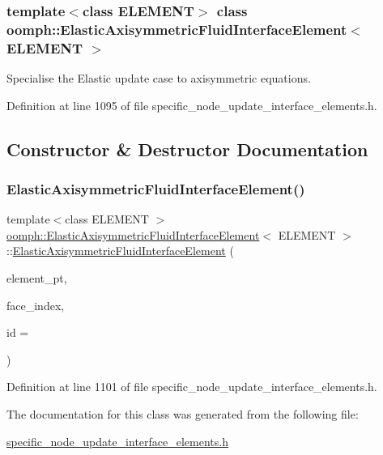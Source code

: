 \subsubsection*{template$<$class E\+L\+E\+M\+E\+NT$>$\newline
class oomph\+::\+Elastic\+Axisymmetric\+Fluid\+Interface\+Element$<$ E\+L\+E\+M\+E\+N\+T $>$}

Specialise the Elastic update case to axisymmetric equations. 

Definition at line 1095 of file specific\+\_\+node\+\_\+update\+\_\+interface\+\_\+elements.\+h.



\subsection{Constructor \& Destructor Documentation}
\mbox{\label{classoomph_1_1ElasticAxisymmetricFluidInterfaceElement_a9cb419f11aa4504bca4b6a9c40cca505}} 
\subsubsection{\texorpdfstring{Elastic\+Axisymmetric\+Fluid\+Interface\+Element()}{ElasticAxisymmetricFluidInterfaceElement()}}
{\footnotesize\ttfamily template$<$class E\+L\+E\+M\+E\+NT $>$ \\
\hyperlink{classoomph_1_1ElasticAxisymmetricFluidInterfaceElement}{oomph\+::\+Elastic\+Axisymmetric\+Fluid\+Interface\+Element}$<$ E\+L\+E\+M\+E\+NT $>$\+::\hyperlink{classoomph_1_1ElasticAxisymmetricFluidInterfaceElement}{Elastic\+Axisymmetric\+Fluid\+Interface\+Element} (\begin{DoxyParamCaption}\item[{\hyperlink{classoomph_1_1FiniteElement}{Finite\+Element} $\ast$const \&}]{element\+\_\+pt,  }\item[{const int \&}]{face\+\_\+index,  }\item[{const unsigned \&}]{id = {} }\end{DoxyParamCaption})\hspace{0.3cm}{\ttfamily [inline]}}



Definition at line 1101 of file specific\+\_\+node\+\_\+update\+\_\+interface\+\_\+elements.\+h.



The documentation for this class was generated from the following file\+:\begin{DoxyCompactItemize}
\item 
\hyperlink{specific__node__update__interface__elements_8h}{specific\+\_\+node\+\_\+update\+\_\+interface\+\_\+elements.\+h}\end{DoxyCompactItemize}
